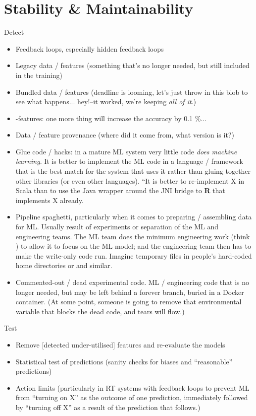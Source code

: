 \documentclass[10 pt, twocolumn]{article}
\begin{document}
\section{Stability \& Maintainability}
Detect
\begin{itemize}
  \item Feedback loops, especially hidden feedback loops
  \item Legacy data / features (something that's no longer needed, but still included in the training)
  \item Bundled data / features (deadline is looming, let's just throw in this blob to see what happens... hey!--it worked, we're keeping \emph{all of it}.)
  \item \textepsilon-features: one more thing will increase the accuracy by 0.1 \%...
  \item Data / feature provenance (where did it come from, what version is it?)
  \item Glue code / hacks: in a mature ML system very little code \emph{does machine learning}. It is better to implement the ML code in a language / framework that is the best match for the system that uses it rather than gluing together other libraries (or even other languages). ``It is better to re-implement X in Scala than to use the Java wrapper around the JNI bridge to \textbf{\textsf{R}} that implements X already.
  \item Pipeline spaghetti, particularly when it comes to preparing / assembling data for ML. Usually result of experiments or separation of the ML and engineering teams. The ML team does the minimum engineering work (think ) to allow it to focus on the ML model; and the engineering team then has to make the write-only code run. Imagine temporary files in people's hard-coded home directories or  and similar.
  \item Commented-out / dead experimental code. ML / engineering code that is no longer needed, but may be left behind a forever  branch, buried in a Docker container. (At some point, someone is going to remove that environmental variable that blocks the dead code, and tears will flow.)
\end{itemize}

Test
\begin{itemize}
  \item Remove [detected under-utilised] features and re-evaluate the models
  \item Statistical test of predictions (sanity checks for biases and ``reasonable'' predictions)
  \item Action limits (particularly in RT systems with feedback loops to prevent ML from ``turning on X'' as the outcome of one prediction, immediately followed by ``turning off X'' as a result of the prediction that follows.)
\end{itemize}  

\printbibliography
\end{document}
